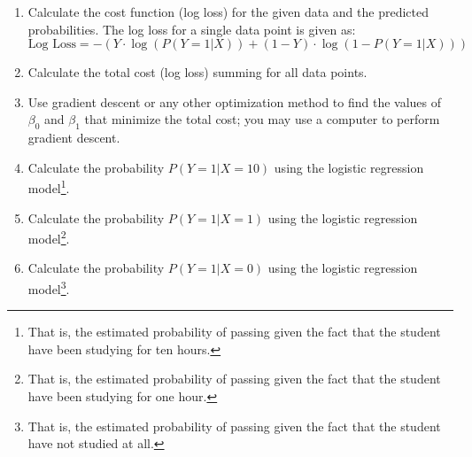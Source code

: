 \documentclass[]{article}
\begin{document}
	\begin{enumerate}
		\item Calculate the cost function (log loss) for the given data and the predicted probabilities. The log loss for a single data point is given as:
		$$\text{Log Loss} = -\left(Y \cdot \log(P(Y=1|X)) + (1 - Y) \cdot \log(1 - P(Y=1|X))\right)$$
		\item Calculate the total cost (log loss) summing for all data points.
		\item Use gradient descent or any other optimization method to find the values of $\beta_0$ and $\beta_1$ that minimize the total cost; you may use a computer to perform gradient descent.
		\item Calculate the probability $P(Y=1|X=10)$ using the logistic regression model\footnote{That is, the estimated probability of passing given the fact that the student have been studying for ten hours.}.
		\item Calculate the probability $P(Y=1|X=1)$ using the logistic regression model\footnote{That is, the estimated probability of passing given the fact that the student have been studying for one hour.}.
		\item Calculate the probability $P(Y=1|X=0)$ using the logistic regression model\footnote{That is, the estimated probability of passing given the fact that the student have not studied at all.}.
	\end{enumerate}
	
	
\end{document}
